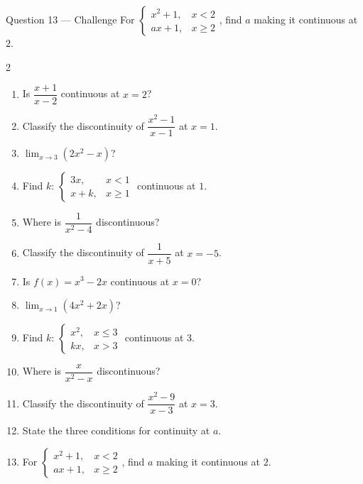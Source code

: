 \documentclass[11pt]{article}
\begin{document}
\begin{qbox}{Question 13 --- Challenge}
For $\begin{cases}x^2+1,&x<2\\ax+1,&x\ge2\end{cases}$, find $a$ making it continuous at $2$.\workspace{3cm}
\end{qbox}

\clearpage
{}

\begin{recapbox}
\begin{multicols}{2}
\small
\begin{enumerate}[leftmargin=*,itemsep=3pt]
  \item Is $\dfrac{x+1}{x-2}$ continuous at $x=2$?
  \item Classify the discontinuity of $\dfrac{x^2-1}{x-1}$ at $x=1$.
  \item $\displaystyle\lim_{x\to3}(2x^2-x)$?
  \item Find $k$: $\begin{cases}3x,&x<1\\x+k,&x\ge1\end{cases}$ continuous at $1$.
  \item Where is $\dfrac1{x^2-4}$ discontinuous?
  \item Classify the discontinuity of $\dfrac1{x+5}$ at $x=-5$.
  \item Is $f(x)=x^3-2x$ continuous at $x=0$?
  \item $\displaystyle\lim_{x\to1}(4x^2+2x)$?
  \item Find $k$: $\begin{cases}x^2,&x\le3\\kx,&x>3\end{cases}$ continuous at $3$.
  \item Where is $\dfrac{x}{x^2-x}$ discontinuous?
  \item Classify the discontinuity of $\dfrac{x^2-9}{x-3}$ at $x=3$.
  \item State the three conditions for continuity at $a$.
  \item For $\begin{cases}x^2+1,&x<2\\ax+1,&x\ge2\end{cases}$, find $a$ making it continuous at $2$.
\end{enumerate}
\end{multicols}
\end{recapbox}
\end{document}
